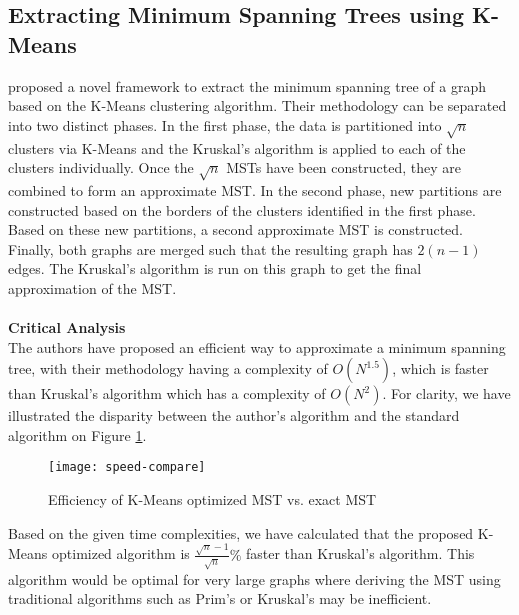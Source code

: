 \subsection{Extracting Minimum Spanning Trees using K-Means}
 proposed a novel framework to extract the minimum spanning tree of a graph based on the K-Means clustering algorithm. Their methodology can be separated into two distinct phases. In the first phase,  the data is partitioned into $\sqrt{n}$ clusters via K-Means and the Kruskal's algorithm is applied to each of the clusters individually.  Once the $\sqrt{n}$ MSTs have been constructed, they are combined to form an approximate MST. In the second phase,  new partitions are constructed based on the borders of the clusters identified in the first phase.  Based on these new partitions, a second approximate MST is constructed.  Finally, both graphs are merged such that the resulting graph has $2(n-1)$ edges. The Kruskal's algorithm is run on this graph to get the final approximation of the MST.
\\\\\textbf{Critical Analysis}\\
The authors have proposed an efficient way to approximate a minimum spanning tree, with their methodology having a complexity of $O(N^{1.5})$, which is faster than Kruskal's algorithm which has a complexity of $O(N^2)$. 
For clarity, we have illustrated the disparity between the author's algorithm and the standard algorithm on Figure \ref{fig:speed-compare}.
\begin{figure}[H]
\centering
\texttt{[image: speed-compare]} 
\caption{Efficiency of K-Means optimized MST vs.  exact MST}\label{fig:speed-compare}
\end{figure}
\noindent Based on the given time complexities, we have calculated that the proposed K-Means optimized algorithm is $\frac{\sqrt{n}-1}{\sqrt{n}}\%$  faster than Kruskal's algorithm. This algorithm would be optimal for very large graphs where deriving the MST using traditional algorithms such as Prim's or Kruskal's may be inefficient.


